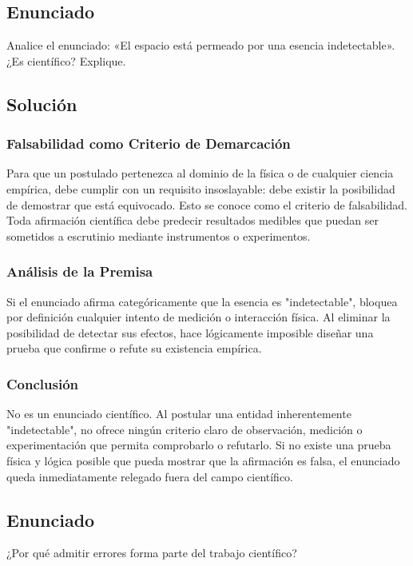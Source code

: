 \documentclass[12pt, a4paper]{article}
\begin{document}
\newpage

\subsection*{Enunciado}
Analice el enunciado: «El espacio está permeado por una esencia indetectable». ¿Es científico? Explique.

\subsection*{Solución}

\subsubsection*{Falsabilidad como Criterio de Demarcación}
Para que un postulado pertenezca al dominio de la física o de cualquier ciencia empírica, debe cumplir con un requisito insoslayable: debe existir la posibilidad de demostrar que está equivocado. Esto se conoce como el criterio de falsabilidad. Toda afirmación científica debe predecir resultados medibles que puedan ser sometidos a escrutinio mediante instrumentos o experimentos.

\subsubsection*{Análisis de la Premisa}
Si el enunciado afirma categóricamente que la esencia es "indetectable", bloquea por definición cualquier intento de medición o interacción física. Al eliminar la posibilidad de detectar sus efectos, hace lógicamente imposible diseñar una prueba que confirme o refute su existencia empírica. 

\subsubsection*{Conclusión}
No es un enunciado científico. Al postular una entidad inherentemente "indetectable", no ofrece ningún criterio claro de observación, medición o experimentación que permita comprobarlo o refutarlo. Si no existe una prueba física y lógica posible que pueda mostrar que la afirmación es falsa, el enunciado queda inmediatamente relegado fuera del campo científico.

\newpage

\subsection*{Enunciado}
¿Por qué admitir errores forma parte del trabajo científico?
\end{document}
